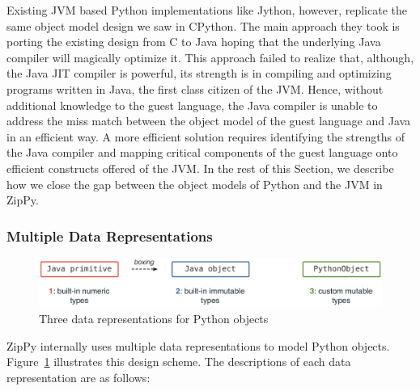 Existing JVM based Python implementations like Jython, however, replicate the same object model design we saw in CPython.
The main approach they took is porting the existing design from C to Java hoping that the underlying Java compiler will magically optimize it.
This approach failed to realize that, although, the Java JIT compiler is powerful, its strength is in compiling and optimizing programs written in Java,
the first class citizen of the JVM.
Hence, without additional knowledge to the guest language, the Java compiler is unable to address the miss match between the object model of the guest language and Java in an efficient way.
A more efficient solution requires identifying the strengths of the Java compiler and mapping critical components of the guest language onto efficient constructs offered of the JVM.
In the rest of this Section, we describe how we close the gap between the object models of Python and the JVM in ZipPy.

\subsubsection{Multiple Data Representations}

\begin{figure}
\centering
\includegraphics[scale=.6]{figures/ch5-three-data-representations}
\caption{Three data representations for Python objects}
\label{fig:ch5-three-data-representations}
\end{figure}

ZipPy internally uses multiple data representations to model Python objects.
Figure~\ref{fig:ch5-three-data-representations} illustrates this design scheme.
The descriptions of each data representation are as follows:

